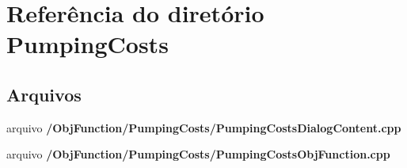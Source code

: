 \section{Referência do diretório Pumping\+Costs}
\label{dir_8b59370d484b8b7cdf87478888658b19}
\subsection*{Arquivos}
\begin{DoxyCompactItemize}
\item 
arquivo {\bf /\+Obj\+Function/\+Pumping\+Costs/\+Pumping\+Costs\+Dialog\+Content.\+cpp}
\item 
arquivo {\bf /\+Obj\+Function/\+Pumping\+Costs/\+Pumping\+Costs\+Obj\+Function.\+cpp}
\end{DoxyCompactItemize}
